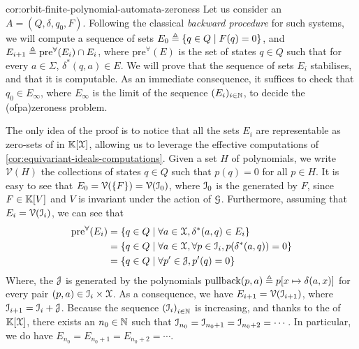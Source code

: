 \begin{proofof}{cor:orbit-finite-polynomial-automata-zeroness}
  Let us consider an  
  $A = (Q, \delta, q_0, F)$. Following the classical \emph{backward procedure} for such
  systems, we will compute a sequence of sets $E_0 \triangleq \{  q \in Q  \mid 
  F(q) = 0  \}$, and $E_{i+1} \triangleq \mathrm{pre}^\forall(E_i) \cap E_i$, where
  $\mathrm{pre}^\forall(E)$ is the set of states $q \in Q$ such that for every
  $a \in \Sigma$, $\delta^*(q,a) \in E$. We will prove that the sequence of
  sets $E_i$ stabilises, and that it is computable. As an immediate
  consequence, it suffices to check that $q_0 \in E_{\infty}$, where $E_\infty$
  is the limit of the sequence $(E_i)_{i \in \mathbb{N}}$, to decide the
  \kl(ofpa){zeroness problem}.

  The only idea of the proof is to notice that all the sets $E_i$ are
  representable as zero-sets of  in
  $\mathbb{K}[\mathcal{X}]$, allowing us to leverage the effective computations of
  \cref{cor:equivariant-ideals-computations}. Given a set $H$ of polynomials,
  we write $\mathcal{V}(H)$ the collections of states $q \in Q$ such that $p(q)
  = 0$ for all $p \in H$.
  It is easy to see that $E_0 = \mathcal{V}(\set{F}) = \mathcal{V}(\idl_0)$,
  where $\idl_0$ is the  generated by $F$, since 
  $F \in \mathbb{K}[V]$ and $V$ is invariant under the action of $\mathcal{G}$.
  Furthermore, assuming that $E_i = \mathcal{V}(\idl_i)$, we can
  see that 
  \begin{align*}
    \mathrm{pre}^\forall(E_i) 
    & = \setof{ q \in Q }{ \forall a \in \Indets, \delta^*(a,q) \in E_i } \\
    & = \setof{ q \in Q }{ \forall a \in \Indets, \forall p \in \idl_i, p(\delta^*(a,q)) = 0 } \\
    & = \setof{ q \in Q }{ \forall p' \in \idl[J], p'(q) = 0 }
  \end{align*}
  Where, the  $\idl[J]$ is generated by the
  polynomials $\mathrm{pullback}(p,a) \triangleq p [ x \mapsto \delta(a,x)]$
  for every pair $(p, a) \in \idl_i \times \Indets$. 
  As a consequence, we have $E_{i+1} = \mathcal{V}(\idl_{i+1})$, where
  $\idl_{i+1} = \idl_i + \idl[J]$.
  Because the sequence $\seqof{ \idl_i }[ i \in \N]$ is increasing, and thanks
  to the  of $\mathbb{K}[\mathcal{X}]$, there
  exists an $n_0 \in \mathbb{N}$ such that $\idl_{n_0} = \idl_{n_0 + 1} = \idl_{n_0 +
  2} = \cdots$. In particular, we do have $E_{n_0} = E_{n_0 + 1} = E_{n_0 + 2}
  = \cdots$.


\end{proofof}
